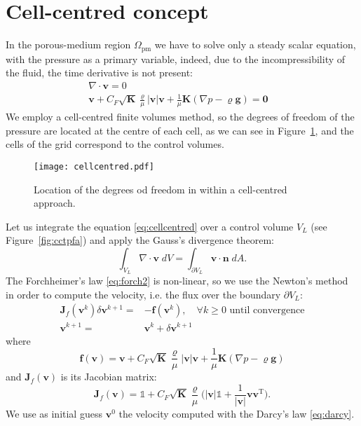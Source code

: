 \section{Cell-centred concept}
In the porous-medium region $\Omega_\text{pm}$ we have to solve only a steady 
scalar equation, with the 
pressure as a primary variable, indeed, due to the incompressibility of the 
fluid, the time derivative is not present:
\begin{align}
\label{eq:cellcentred}	\nabla \cdot \mathbf{v} = 0&\\
\label{eq:forch2}	\mathbf{v} + C_F \sqrt{\mathbf{K}} \frac{\varrho}{\mu} 
	|\mathbf{v}|\mathbf{v} + \frac{1}{\mu} \mathbf{K}(\nabla p - \varrho 
	\mathbf{g} ) = \mathbf{0}&
\end{align}
We employ a cell-centred finite volumes method, so the degrees of freedom of 
the pressure are located at the centre of each cell, as we can see in 
Figure~\ref{fig:cellcentred}, and the cells of the grid correspond to the 
control volumes.
\begin{figure}
	\centering
	\texttt{[image: cellcentred.pdf]}
	\caption[Cell-centred grid]{Location of the degrees od freedom in within a 
	cell-centred approach.}
	\label{fig:cellcentred}
\end{figure}

Let us integrate the equation \eqref{eq:cellcentred} over a control volume 
$V_L$ (see Figure~\ref{fig:cctpfa}) and apply the Gauss's divergence theorem:
\begin{equation}
\int_{V_L} \nabla \cdot \mathbf{v} \; dV = \int_{\partial V_L} \mathbf{v} \cdot 
\mathbf{n} \; dA.
\end{equation}
The Forchheimer's law \eqref{eq:forch2} is non-linear, so we use the Newton's 
method in order to compute the velocity, i.e. the flux over the boundary 
$\partial 
V_L$:
\begin{align}
	\mathbf{J}_f(\mathbf{v}^k) \delta \mathbf{v}^{k+1} =& 
	-\mathbf{f}(\mathbf{v}^k), \quad \text{$\forall k\geq 0$ until 
	convergence}\\
	\mathbf{v}^{k+1} =& \mathbf{v}^k + \delta \mathbf{v}^{k+1}
\end{align}
where
\begin{equation} \label{eq:resforch}
	\mathbf{f}(\mathbf{v}) = \mathbf{v} + C_F \sqrt{\mathbf{K}} 
	\frac{\varrho}{\mu} 
	|\mathbf{v}|\mathbf{v} + \frac{1}{\mu} \mathbf{K}(\nabla p - \varrho 
	\mathbf{g} )
\end{equation}
and $\mathbf{J}_f(\mathbf{v})$ is its Jacobian matrix:
\begin{equation} \label{eq:jacforch}
\mathbf{J}_f(\mathbf{v}) = \mathbb{1} + 
C_F\sqrt{\mathbf{K}}\frac{\varrho}{\mu}\big(|\mathbf{v}|\mathbb{1} + 
\frac{1}{|\mathbf{v}|}{\mathbf{v}\mathbf{v}^\mathrm{T}}\big).
\end{equation}
We use as initial guess $\mathbf{v}^0$ the velocity computed with the Darcy's 
law \eqref{eq:darcy}.

